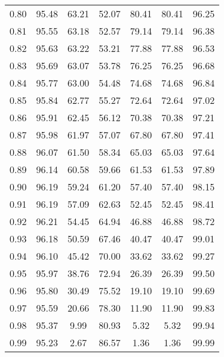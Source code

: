 \begin{tabular}{|c|c|c|c|c|c|c|}
      0.80 &     95.48 &     63.21 &      52.07 &   80.41 &      80.41 &         96.25 \\
      0.81 &     95.55 &     63.18 &      52.57 &   79.14 &      79.14 &         96.38 \\
      0.82 &     95.63 &     63.22 &      53.21 &   77.88 &      77.88 &         96.53 \\
      0.83 &     95.69 &     63.07 &      53.78 &   76.25 &      76.25 &         96.68 \\
      0.84 &     95.77 &     63.00 &      54.48 &   74.68 &      74.68 &         96.84 \\
      0.85 &     95.84 &     62.77 &      55.27 &   72.64 &      72.64 &         97.02 \\
      0.86 &     95.91 &     62.45 &      56.12 &   70.38 &      70.38 &         97.21 \\
      0.87 &     95.98 &     61.97 &      57.07 &   67.80 &      67.80 &         97.41 \\
      0.88 &     96.07 &     61.50 &      58.34 &   65.03 &      65.03 &         97.64 \\
      0.89 &     96.14 &     60.58 &      59.66 &   61.53 &      61.53 &         97.89 \\
      0.90 &     96.19 &     59.24 &      61.20 &   57.40 &      57.40 &         98.15 \\
      0.91 &     96.19 &     57.09 &      62.63 &   52.45 &      52.45 &         98.41 \\
      0.92 &     96.21 &     54.45 &      64.94 &   46.88 &      46.88 &         98.72 \\
      0.93 &     96.18 &     50.59 &      67.46 &   40.47 &      40.47 &         99.01 \\
      0.94 &     96.10 &     45.42 &      70.00 &   33.62 &      33.62 &         99.27 \\
      0.95 &     95.97 &     38.76 &      72.94 &   26.39 &      26.39 &         99.50 \\
      0.96 &     95.80 &     30.49 &      75.52 &   19.10 &      19.10 &         99.69 \\
      0.97 &     95.59 &     20.66 &      78.30 &   11.90 &      11.90 &         99.83 \\
      0.98 &     95.37 &      9.99 &      80.93 &    5.32 &       5.32 &         99.94 \\
      0.99 &     95.23 &      2.67 &      86.57 &    1.36 &       1.36 &         99.99 \\
\bottomrule
\end{tabular}
